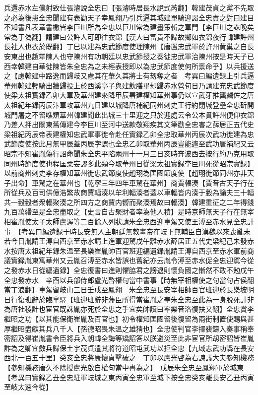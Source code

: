 兵還赤水左僕射致仕張濬說全忠曰【張濬時居長水說式芮翻】韓建茂貞之黨不先取之必為後患全忠聞建有表勸天子幸鳳翔乃引兵逼其城建單騎迎謁全忠責之對曰建目不知書凡表章書檄皆李巨川所為全忠以巨川常為建畫策斬之軍門【李巨川之誅晚矣常為于偽翻】謂建曰公許人可即往衣錦【漢人曰富貴不歸故鄉如衣錦夜行韓建許州長社人也衣於既翻】丁巳以建為忠武節度使理陳州【唐置忠武軍於許州黄巢之自長安東出也趙犨陳人也守陳州有功朝廷以忠武節授之奏徙忠武軍治陳州按是時天子已西幸韓建自華徙陳皆朱全忠為之未經表授即以為忠武節度使何所禀命乎】以兵援送之【慮韓建中路逸而歸岐又慮其在華久其將士有刼奪之者　考異曰編遺録上引兵逼華州韓建輕騎出牆歸投上於西溪亭子與建飲膳畢却歸赤水營旬日乃請建充忠武節度使梁太祖實録乙卯大軍及華州建來降甲辰署建權知華州事仍以宣武牙推龔麟佐之唐太祖紀年録丙辰汴軍攻華州九日建以城降唐補紀同州刺史王行約閉城登壘全忠斫開城門屠之不留噍類華州韓建聞此出城三十里迎之只於迎處云令公本貫許州便仰衣錦乃差人押出關東舊傳建今李巨川至河中送款敬翔疾其文筆勸全忠害之薛居正五代史梁祖紀丙辰帝表建權知忠武軍事徙令赴任實録乙卯全忠取華州丙辰次武功徙建為忠武節度使按此月無甲辰蓋丙辰字誤也全忠乙卯取華州丙辰豈能遽至武功唐補紀又云昭宗不知崔胤偽行詔命聞朱全忠平陷兩州十一月三日亥時奔波西去按行約乃克用取同州時節度使也程匡柔妄謬多此類今取華州日從梁太祖實録李巨川死從昭宗實録】以前商州刺史李存權知華州徙忠武節度使趙珝為匡國節度使【趙珝徙節同州亦非天子出命】車駕之在華州也【乾寧三年四年車駕在華州】商賈輻湊【賈音古天子行在所從兵及百司供億浩繁故商賈輻湊以牟利輻湊者蓋以車輻皆内湊于轂為諭夫三十輻共一轂轂者衆輻聚湊之所四方之商賈内嚮而聚湊焉故曰輻湊】韓建重征之二年得錢九百萬緡至是全忠盡取之【史言自古聚財者率為他人積】是時京師無天子行在無宰相崔胤使太子太師盧渥等二百餘人列狀請朱全忠西迎車駕又使王溥至赤水見全忠計事　【考異曰編遺録于時長安無人主朝廷無敕畫帝在岐下無輔臣自漢魏以來喪亂未若今日胤請王溥自西京至赤水請上進軍迎駕戊午離赤水薛居正五代史梁紀己未發赤水按唐太祖紀年録朱温至長樂崔胤帥百官班迎編遺録胤請王溥自西京至赤水軍前商議實録胤東寓華州又云胤召溥至赤水皆誤也舊紀亦云胤令溥至赤水促全忠迎駕今從之發赤水日從編遺録】全忠復書曰進則懼脇君之謗退則懷負國之慚然不敢不勉戊午全忠發赤水　辛酉以兵部侍郎盧光啓權句當中書事【時無宰相權使之句當句占侯翻當丁浪翻】車駕留岐山三日壬戌至鳳翔　朱全忠至長安宰相帥百官班迎於長樂坡明日行復班辭於臨臯驛【班迎班辭非藩臣所得當崔胤之奉朱全忠至此為一身脱死計非為唐社稷計也宦官既誅胤亦死於全忠之手宜矣帥讀曰率樂音洛復扶又翻】全忠賞李繼昭之功【以其能保衛崔胤及百官也】初令權知匡國留後復留為兩街制置使賜與甚厚繼昭盡獻其兵八千人【孫德昭畏朱温之雄猜也】全忠使判官李擇裴鑄入奏事稱奉密詔及得崔胤書令臣將兵入朝韓全誨等矯詔答以朕避災至此非宦官所刼密詔皆崔胤詐為之卿宜斂兵歸保土宇茂貞遣其將符道昭屯武功以拒全忠【九域志武功縣在長安西北一百五十里】癸亥全忠將康懷貞擊破之　丁卯以盧光啓為右諫議大夫參知機務【參知機務唐久不除授盧光啟自權句當中書為之】　戊辰朱全忠至鳳翔軍於城東【考異曰實録乙丑全忠駐軍岐城之東丙寅全忠軍至城下按全忠癸亥離長安乙丑丙寅至岐太速今從】

